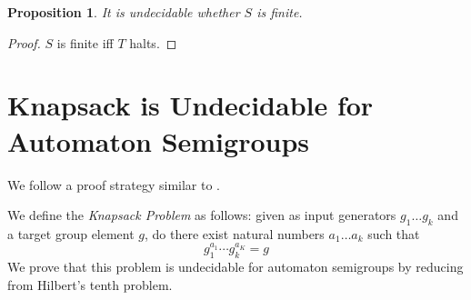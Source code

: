 \documentclass[10pt]{article} %
\newtheorem{proposition}{Proposition}
\newcommand{\defn}[1]{\textit{#1}}
\begin{document}
    \begin{proposition}
    It is undecidable whether $S$ is finite.
    \end{proposition}
    \begin{proof}
    $S$ is finite iff $T$ halts.
    \end{proof}

    \section{Knapsack is Undecidable for Automaton Semigroups} 
    We follow a proof strategy similar to \cite{Konig15:knapsack}.

    We define the \defn{Knapsack Problem} as follows: given as input generators $g_1 \ldots g_k$ and a target group element $g$, do there exist natural numbers $a_1\ldots a_k$ such that 
    \[ g_1^{a_1} \cdots g_k^{a_K} = g \]
    We prove that this problem is undecidable for automaton semigroups by reducing from %
    Hilbert's tenth problem.


    

\end{document}
